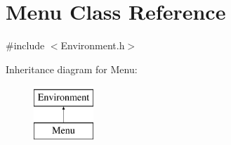 \hypertarget{class_menu}{}\section{Menu Class Reference}
\label{class_menu}


{\ttfamily \#include $<$Environment.\+h$>$}

Inheritance diagram for Menu\+:\begin{figure}[H]
\begin{center}
\leavevmode
\includegraphics[height=2.000000cm]{class_menu}
\end{center}
\end{figure}
